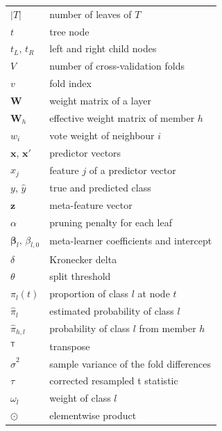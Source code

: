 \documentclass[conference]{IEEEtran}
\begin{document}
\begin{tabular}{@{}ll@{}}
    $|T|$                          & number of leaves of $T$                          \\
    $t$                            & tree node                                        \\
    $t_L$, $t_R$                   & left and right child nodes                       \\
    $V$                            & number of cross-validation folds                 \\
    $v$                            & fold index                                       \\
    $\mathbf{W}$                   & weight matrix of a layer                         \\
    $\mathbf{W}_h$                 & effective weight matrix of member $h$            \\
    $w_i$                          & vote weight of neighbour $i$                     \\
    $\mathbf{x}$, $\mathbf{x}'$    & predictor vectors                                \\
    $x_j$                          & feature $j$ of a predictor vector                \\
    $y$, $\hat{y}$                 & true and predicted class                         \\
    $\mathbf{z}$                   & meta-feature vector                              \\
    $\alpha$                       & pruning penalty for each leaf                    \\
    $\bm{\beta}_l$, $\beta_{l,0}$  & meta-learner coefficients and intercept          \\
    $\delta$                       & Kronecker delta                                  \\
    $\theta$                       & split threshold                                  \\
    $\pi_l(t)$                     & proportion of class $l$ at node $t$              \\
    $\hat{\pi}_l$                  & estimated probability of class $l$               \\
    $\hat{\pi}_{h,l}$              & probability of class $l$ from member $h$         \\
    $^{\mathsf T}$                 & transpose                                        \\
    $\hat{\sigma}^2$               & sample variance of the fold differences          \\
    $\tau$                         & corrected resampled t statistic                  \\
    $\omega_l$                     & weight of class $l$                              \\
    $\odot$                        & elementwise product                              \\
    \bottomrule
\end{tabular}



\end{document}
